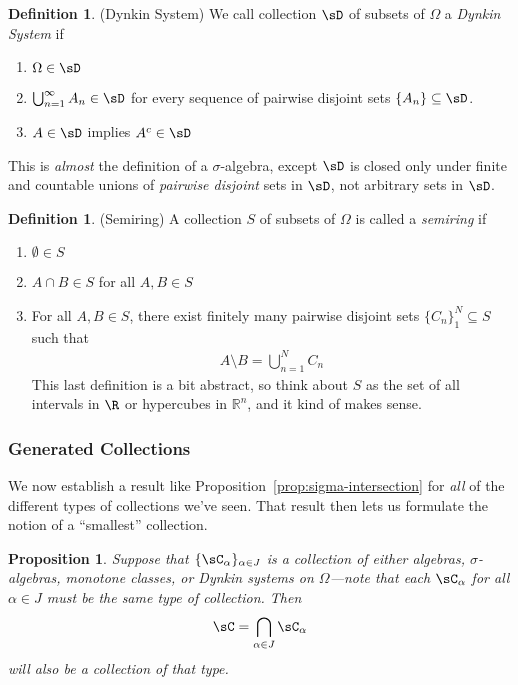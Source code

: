 \documentclass[12pt]{article}
\theoremstyle{plain}
\newtheorem{prop}[thm]{Proposition}
\theoremstyle{definition}
\newtheorem{defn}[thm]{Definition}
\theoremstyle{remark}
\newcommand{\Rn}{\mathbb{R}^n}
\newcommand{\ninf}{_{n=1}^\infty}
\newcommand{\nN}{_{n=1}^N}
\begin{document}
\begin{defn}(Dynkin System)
We call collection $\sD$ of subsets of $\Omega$ a
\emph{Dynkin System} if
\begin{enumerate}
  \item $\Omega\in\sD$
  \item $\bigcup\ninf A_n \in \sD$ for every sequence of pairwise
    disjoint sets $\{A_n\}\subseteq \sD$.
  \item $A\in\sD$ implies $A^c\in\sD$
\end{enumerate}
This is \emph{almost} the definition of a $\sigma$-algebra, except $\sD$
is closed only under finite and countable unions of \emph{pairwise
disjoint} sets in $\sD$, not arbitrary sets in $\sD$.
\end{defn}


\begin{defn}(Semiring)
A collection $S$ of subsets of $\Omega$ is called a \emph{semiring} if
\begin{enumerate}
  \item $\emptyset \in S$
  \item $A\cap B\in S$ for all $A,B\in S$
  \item For all $A,B\in S$, there exist finitely many pairwise disjoint
    sets $\{C_n\}_1^N\subseteq S$ such that
    \begin{align*}
      A \setminus B = \bigcup\nN C_n
    \end{align*}
    This last definition is a bit abstract, so think about $S$ as the
    set of all intervals in $\R$ or hypercubes in $\Rn$, and it kind of
    makes sense.
\end{enumerate}
\end{defn}

\subsubsection{Generated Collections}

We now establish a result like Proposition~\ref{prop:sigma-intersection}
for \emph{all} of the different types of collections we've seen. That
result then lets us formulate the notion of a ``smallest'' collection.

\begin{prop}
Suppose that $\{\sC_\alpha\}_{\alpha \in J}$ is a collection of either
algebras, $\sigma$-algebras, monotone classes,
or Dynkin systems on $\Omega$---note that each $\sC_\alpha$ for all
$\alpha\in J$ must be the same type of collection. Then
\begin{align*}
  \sC = \bigcap_{\alpha \in J} \sC_\alpha
\end{align*}
will also be a collection of that type.
\end{prop}
\end{document}
